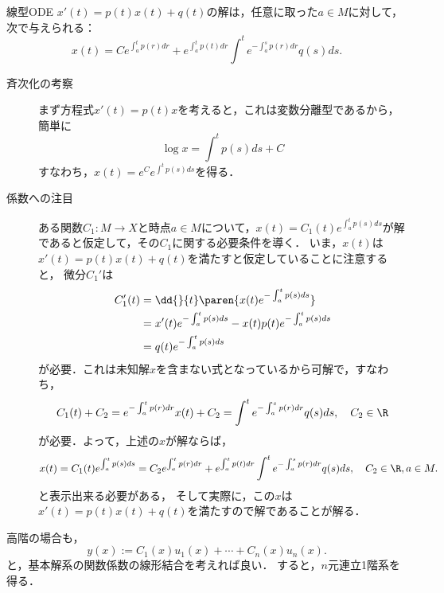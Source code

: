 \documentclass[uplatex,dvipdfmx]{jsreport}
\begin{document}
\begin{theorem}[Duhamel]\label{thm-Duhamel}
    線型ODE $x'(t)=p(t)x(t)+q(t)$の解は，任意に取った$a\in M$に対して，次で与えられる：
    \[x(t)=Ce^{\int^t_ap(r)dr}+e^{\int^t_ap(t)dr}\int^te^{-\int^s_ap(r)dr}q(s)ds.\]
\end{theorem}
\begin{Proof}\mbox{}
    \begin{description}
        \item[斉次化の考察] まず方程式$x'(t)=p(t)x$を考えると，これは変数分離型であるから，簡単に
        \[\log x=\int^tp(s)ds+C\]
        すなわち，$x(t)=e^Ce^{\int^tp(s)ds}$を得る．
        \item[係数への注目] ある関数$C_1:M\to X$と時点$a\in M$について，$x(t)=C_1(t)e^{\int^t_ap(s)ds}$が解であると仮定して，その$C_1$に関する必要条件を導く．
        いま，$x(t)$は$x'(t)=p(t)x(t)+q(t)$を満たすと仮定していることに注意すると，
        微分$C_1'$は
        \begin{align*}
            C_1'(t)&=\dd{}{t}\paren{x(t)e^{-\int^t_ap(s)ds}}\\
            &=x'(t)e^{-\int^t_ap(s)ds}-x(t)p(t)e^{-\int^t_ap(s)ds}\\
            &=q(t)e^{-\int^t_ap(s)ds}
        \end{align*}
        が必要．これは未知解$x$を含まない式となっているから可解で，すなわち，
        \[C_1(t)+C_2=e^{-\int^t_ap(r)dr}x(t)+C_2=\int^te^{-\int^s_ap(r)dr}q(s)ds,\quad C_2\in\R\]
        が必要．よって，上述の$x$が解ならば，
        \[x(t)=C_1(t)e^{\int^t_ap(s)ds}=C_2e^{\int^t_ap(r)dr}+e^{\int^t_ap(t)dr}\int^te^{-\int^s_ap(r)dr}q(s)ds,\quad C_2\in\R,a\in M.\]
        と表示出来る必要がある，
        そして実際に，この$x$は$x'(t)=p(t)x(t)+q(t)$を満たすので解であることが解る．
    \end{description}
\end{Proof}
\begin{remarks}
    高階の場合も，
    \[y(x):=C_1(x)u_1(x)+\cdots+C_n(x)u_n(x).\]
    と，基本解系の関数係数の線形結合を考えれば良い．
    すると，$n$元連立1階系を得る．
\end{remarks}
\end{document}
